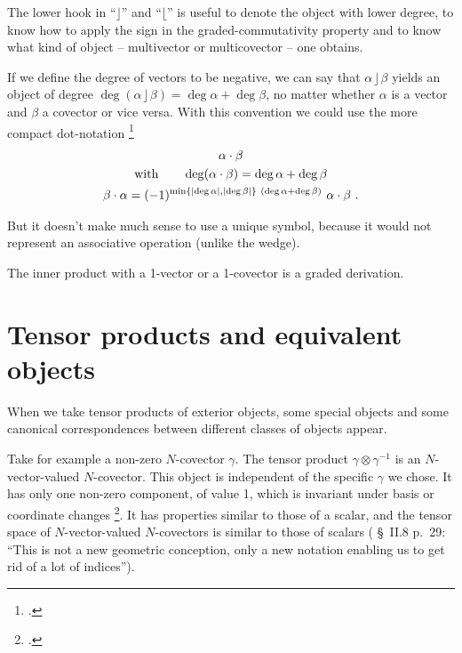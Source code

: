 \documentclass[\ifafour a4paper,12pt,\else a5paper,10pt,\fi%
onecolumn,oneside,article,%
british%
]{memoir}
\theoremstyle{remark}
\theoremstyle{innote}
\newcommand*{\citep}{\footcites}
\DeclarePairedDelimiter\abs{\lvert}{\rvert}
\DeclarePairedDelimiter\set{\{}{\}} %
\renewcommand*{\|}[1][]{\nonscript\:#1\vert\nonscript\:\mathopen{}}
\newcommand*{\sect}{\S}%
\newcommand*{\cf}{{cf.}}
\newcommand*{\ii}{\mathbin{\rfloor}}
\newcommand*{\rii}{\mathbin{\lfloor}}
\begin{document}
The lower hook in \enquote{$\ii$} and \enquote{$\rii$} is useful to denote
the object with lower degree, to know how to apply the sign in the
graded-commutativity property and to know what kind of object --
multivector or multicovector -- one obtains.

If we define the degree of vectors to be negative, we can say that
$\alpha \ii \beta$ yields an object of degree
$\deg(\alpha\ii\beta)=\deg\alpha+\deg\beta$, no matter whether $\alpha$ is
a vector and $\beta$ a covector or vice versa. With this convention we
could use the more compact dot-notation
\citep[\cf][\sect~F.I.267]{truesdelletal1960}
\begin{equation}
  \label{eq:inner_dot}
  \begin{gathered}
    \alpha \cdot \beta
    \\
    \text{with}\qquad
    \deg(\alpha \cdot \beta) = \deg\alpha+\deg\beta
    \\
    \beta \cdot \alpha =
    (-1)^{\min\set{\abs{\deg \alpha},\abs{\deg\beta}}\ (\deg\alpha+\deg\beta)}\
    \alpha \cdot \beta \ .
\end{gathered}
\end{equation}

But it doesn't make much sense to use a unique symbol, because it would not
represent an associative operation (unlike the wedge).

The inner product with a 1-vector or a 1-covector is a graded derivation.

\section{Tensor products and equivalent objects}
\label{sec:tensor_equivalent}

When we take tensor products of exterior objects, some special objects and
some canonical correspondences between different classes of objects appear.

Take for example a non-zero $N$-covector $\gamma$. The tensor product
$\gamma \otimes \gamma^{-1}$ is an $N$-vector-valued $N$-covector. This
object is independent of the specific $\gamma$ we chose. It has only one
non-zero component, of value 1, which is invariant under basis or
coordinate changes \citep[\sect~II.8 p.~29 bottom]{schouten1951_r1989}. It
has properties similar to those of a scalar, and the tensor space of
$N$-vector-valued $N$-covectors is similar to those of scalars
(\textcite{schouten1951_r1989} \sect~II.8 p.~29: \enquote{This is not a new
  geometric conception, only a new notation enabling us to get rid of a lot
  of indices}).
\end{document}
